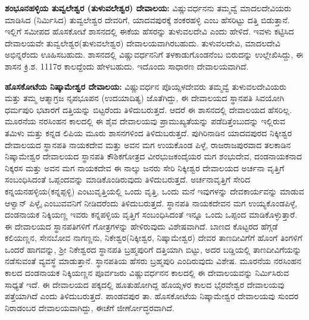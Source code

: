 \textbf{ಶಂಭೂನಹಳ್ಳಿಯ ತುವ್ವಲೇಶ್ವರ (ತುಳುವಲೇಶ್ವರ) ದೇವಾಲಯ:} ವಿಷ್ಣುವರ್ಧನನು ತಮ್ಮವ್ವೆ ಮಾದಲದೇವಿಯರು ಮಾಡಿಸಿದ (ನಿರ್ಮಿಸಿದ) ತುವ್ವಲೇಶ್ವರ ದೇವರಿಗೆ, ಯಾದವಪುರಕ್ಕೆ ಶಂಕರಹಳ್ಳಿ ಎಂಬ ಹೆಸರಿಟ್ಟು ದತ್ತಿ ಬಿಡುತ್ತಾನೆ. ಇಲ್ಲಿಗೆ ಸಮೀಪದ ಹೊಸಕೋಟೆ ಶಾಸನದಲ್ಲಿ ಈಕೆಯ ಹೆಸರನ್ನು ತುಳುವಲದೇವಿ ಎಂದು ಹೇಳಿದೆ. ಇವಳು ಕಟ್ಟಿಸಿದ ದೇವಾಲಯವೇ ತುವ್ವಲೇಶ್ವರ(ತುಳುವಲೇಶ್ವರ) ದೇವಾಲಯವಾಗಿರಬಹುದು. ತುಳುವಲದೇವಿ, ಮಾದಲದೇವಿ ಅಭಿನ್ನರೆಂದು ಊಹಿಸಬಹುದು. ಶಾಸನದಲ್ಲಿ ವಿಷ್ಣುವರ್ಧನನಿಗೆ ತಳಕಾಡುಗೊಂಡನೆಂಬ ಬಿರುದನ್ನು ಉಲ್ಲೇಖಿಸಿದ್ದು, ಈ ಶಾಸನ ಕ್ರಿ.ಶ. 1117ರ ಕಾಲದ್ದೆಂದು ಹೇಳಬಹುದು. ಇದೊಂದು ಸಾಧಾರಣ ದೇವಾಲಯವಾಗಿದೆ.

\textbf{ಹೊಸಕೋಟೆಯ ನಿಷ್ಕಾಮೇಶ್ವರ ದೇವಾಲಯ:} ವಿಷ್ಣುವರ್ಧನ ಪೊಯ್ಸಳದೇವರು ತಮ್ಮವ್ವೆ ತುಳುವಲದೇವಿಯರು ಮತ್ತು ತಮ್ಮ ಆತ್ಮಾಗ್ರಜ ನೃಪಭೂಪನ (ಉದಯಾದಿತ್ಯ) ಜೊತೆಗಿದ್ದು, ಈ ದೇವಾಲಯದ ಸ್ಥಾನಪತಿ ಸಿವಯೋಗಿ ಧರ್ಮಪುರಿ ಭಟಾರಗೆ ದತ್ತಿಯನ್ನು ಬಿಟ್ಟರೆಂದು ತಿಳಿದುಬರುತ್ತದೆ. ಆದರೆ ಈ ಶಾಸನದಲ್ಲಿ ದೇವಾಲಯದ ಹೆಸರಿಲ್ಲ. ಮೂರನೆಯ ನರಸಿಂಹನ ಕಾಲದಲ್ಲಿ ಈ ಶೈವ ದೇವಾಲಯವು ಪ್ರಾಮುಖ್ಯತೆಯನ್ನು ಪಡೆದಿತ್ತೆಂಬುದನ್ನು ಇಲ್ಲಿರುವ ತಮಿಳು ಮತ್ತು ಕನ್ನಡ ಲಿಪಿಯ ಮೂರು ಶಾಸನಗಳಿಂದ ತಿಳಿದುಬರುತ್ತದೆ. ಪುಗಿರಿನಾಡಿನ ಯಾದವಪುರದ ನಿಕ್ಕೀಶ್ವರ ದೇವಾಲಯದ ಸ್ಥಾನಪತಿ ನಾಯಕದೇವ ಮತ್ತು ಅವನ ಮಗ ಉಯಕೊಂಡ ಪಿಳ್ಳೆ, ರಾಜರಾಜಪುರವಾದ ತಲಕಾಡಿನ ನಿಷ್ಕಾಮೇಶ್ವರ ದೇವಾಲಯದ ಸ್ಥಾನಪತಿ ಕೌಶಿಕಗೋತ್ರದ ವೀರಭುಜಕಂದೈಯರ ಮಗ ಶಂಭುದೇವ, ದಂಡನಾಯಕನಾದ ನಿಕ್ಕರಸ ಮತ್ತು ಅವನ ಮಗ ನಾಯಕದೇವ ಈ ನಾಲ್ಕು ಜನರು ಸೇರಿ ನಿಕ್ಕೀಶ್ವರ ದೇವಾಲಯದ ಅರ್ಚನಾ ವೃತ್ತಿಗೆ ಸಂಬಂಧಿಸಿದಂತೆ ಒಪ್ಪಂದವನ್ನು ಮಾಡಿಕೊಂಡಿರುವುದು ತಿಳಿದುಬರುತ್ತದೆ. ಅರ್ಚನಾವೃತ್ತಿಗೆ ಸೇರಿದ ಕನ್ನಯನಹಳ್ಳಿಯ(ಕನ್ನಪ್ಪಳ್ಳಿ) ಎಂಟುವೃತ್ತಿಯಲ್ಲಿ ಒಂದು ವೃತ್ತಿ, ಒಂದು ಮನೆ ಇವುಗಳನ್ನು ದೇವಕಾರ್ಯವನ್ನು ಮಾಡುವ ಆಳ್ವಾನ್​ ಪಿಳ್ಳೈ ಎಂಬುವವನಿಗೆ ನೀಡಿದರೆಂದು ತಿಳಿದು\-ಬರುತ್ತದೆ. ಸ್ಥಾನಪತಿ ನಾಯಕದೇವನ ಮಗ ಉಯ್ಯಕೊಂಡಪಿಳ್ಳೆ, ದಂಡನಾಯಕ ನಿಕ್ಕಿಯಣ್ಣ ಇವರು ಕನ್ನಪಳ್ಳಿಯ ವೃತ್ತಿಗೆ ಸಂಬಂಧಿಸಿದಂತೆ ಇನ್ನೂ ಒಂದು ಒಪ್ಪಂದ ಮಾಡಿಕೊಳ್ಳುತ್ತಾರೆ. ಈ ದೇವಾಲಯದ ಸ್ಥಾನಪತಿಗಳಿಗೆ ಗೋತ್ರಗಳನ್ನು ಹೇಳಿರುವುದು ವಿಶೇಷವಾಗಿದೆ. ಬಾಣದ ಕೊಟ್ಟರದ ಹೆಗ್ಗಡೆ ಕಲಿಯಣ್ಣನ, ಸೇನಬೋವ ನಾಗಣ್ಣನು, ನಿಕೇಶ್ವರ(ನಿಕ್ಕೀಶ್ವರ, ನಿಷ್ಕಾಮೇಶ್ವರ) ದೇವರ ತಾಣದೀವಿಗೆಗೆ ಹೊಂಗೆ ತಿಂಗಳಿಗೆ ಒಂದರೆ ಹಾಗವನ್ನು, ಶ‍್ರೀ ನಿಕೇಶ್ವರದ ಸ್ಥಾನಪತಿ ಬ್ರಹ್ಮಪುರಿಗೆ ದತ್ತಿಯಾಗಿ ಬಿಟ್ಟು, ಅದರ ಬಡ್ಡಿಯಲ್ಲಿ ತಾಣದೀವಿಗೆಯನ್ನು ನಡೆಸುವಂತೆ ವ್ಯವಸ್ಥೆ ಮಾಡುತ್ತಾನೆ. ಸ್ಥಾನಪತಿಯ ಹೆಸರು ಬ್ರಹ್ಮಪುರಿ ಎಂದಿರುವುದು ವಿಶೇಷ. ಮೂರನೆಯ ನರಸಿಂಹನ ಕಾಲದ ದಂಡನಾಯಕ ನಿಕ್ಕಿಯಣ್ಣನ ಪೂರ್ವಜರು ವಿಷ್ಣುವರ್ಧನನ ಕಾಲದಲ್ಲಿ ಈ ದೇವಾಲಯವನ್ನು ನಿರ್ಮಿಸಿರುವ ಸಾಧ್ಯತೆ ಇದೆ. ಈ ದೇವಾಲಯದ ಪಕ್ಕದಲ್ಲಿ ಹೂತುಹೋಗಿದ್ದ ಹೊಯ್ಸಳರ ಕಾಲದ ಭೈರವೇಶ್ವರ ದೇವಾಲಯವು ಪತ್ತೆಯಾಗಿದೆ ಎಂದು ತಿಳಿದುಬರುತ್ತದೆ. ಪಾಂಡವಪುರ ತಾ. ಹೊಸಕೋಟೆಯ ನಿಷ್ಕಾಮೇಶ್ವರ ದೇವಾಲಯವು ಸುಂದರ ನಿರಾಡಂಬರ ದೇವಾಲಯವಾಗಿದ್ದು, ಈಚೆಗೆ ಜೀರ್ಣೋದ್ಧರವಾಗಿದೆ.


